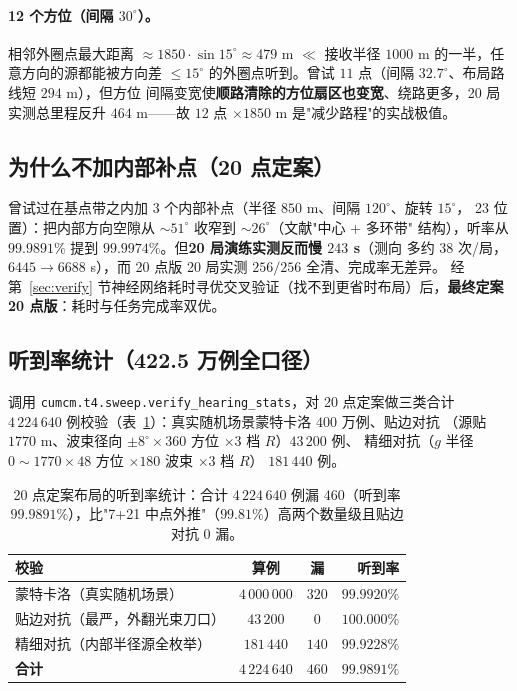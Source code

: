 \paragraph{12 个方位（间隔 $30^\circ$）。} 相邻外圈点最大距离 $\approx 1850\cdot\sin
15^\circ \approx 479$ m $\ll$ 接收半径 $1000$ m 的一半，任意方向的源都能被方向差
$\le 15^\circ$ 的外圈点听到。曾试 $11$ 点（间隔 $32.7^\circ$、布局路线短 $294$ m），但方位
间隔变宽使\textbf{顺路清除的方位扇区也变宽}、绕路更多，20 局实测总里程反升 $464$ m——故
$12$ 点 $\times 1850$ m 是"减少路程"的实战极值。

\subsection{为什么不加内部补点（20 点定案）}

曾试过在基点带之内加 $3$ 个内部补点（半径 $850$ m、间隔 $120^\circ$、旋转 $15^\circ$，
23 位置）：把内部方向空隙从 $\sim 51^\circ$ 收窄到 $\sim 26^\circ$（文献"中心 + 多环带"
结构），听率从 $99.9891\%$ 提到 $99.9974\%$。但\textbf{20 局演练实测反而慢 $243$ s}（测向
多约 $38$ 次/局，$6445 \to 6688$ s），而 20 点版 20 局实测 $256/256$ 全清、完成率无差异。
经第~\ref{sec:verify} 节神经网络耗时寻优交叉验证（找不到更省时布局）后，\textbf{最终定案
20 点版}：耗时与任务完成率双优。

\subsection{听到率统计（422.5 万例全口径）}

调用 \texttt{cumcm.t4.sweep.verify\_hearing\_stats}，对 20 点定案做三类合计
$4\,224\,640$ 例校验（表~\ref{tab:hear}）：真实随机场景蒙特卡洛 $400$ 万例、贴边对抗
（源贴 $1770$ m、波束径向 $\pm 8^\circ\times 360$ 方位 $\times 3$ 档 $R$）$43\,200$ 例、
精细对抗（$g$ 半径 $0\sim1770 \times 48$ 方位 $\times 180$ 波束 $\times 3$ 档 $R$）
$181\,440$ 例。

\begin{table}[H]
  \centering
  \caption{20 点定案布局的听到率统计：合计 $4\,224\,640$ 例漏 $460$（听到率
  $99.9891\%$），比"7+21 中点外推"（$99.81\%$）高两个数量级且贴边对抗 0 漏。}
  \label{tab:hear}
  \begin{tabular}{lccr}
    \toprule
    \textbf{校验} & \textbf{算例} & \textbf{漏} & \textbf{听到率} \\
    \midrule
    蒙特卡洛（真实随机场景） & $4\,000\,000$ & $320$ & $99.9920\%$ \\
    贴边对抗（最严，外翻光束刀口） & $43\,200$ & $0$ & $100.000\%$ \\
    精细对抗（内部半径源全枚举） & $181\,440$ & $140$ & $99.9228\%$ \\
    \textbf{合计} & \textbf{$4\,224\,640$} & \textbf{$460$} & \textbf{$99.9891\%$} \\
    \bottomrule
  \end{tabular}
\end{table}

